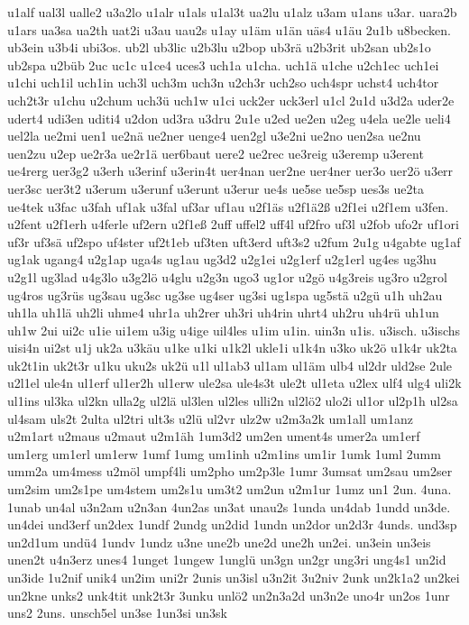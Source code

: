 {u1alf
ual3l
ualle2
u3a2lo
u1alr
u1als
u1al3t
ua2lu
u1alz
u3am
u1ans
u3ar.
uara2b
u1ars
ua3sa
ua2th
uat2i
u3au
uau2s
u1ay
u1äm
u1än
uäs4
u1äu
2u1b
u8becken.
ub3ein
u3b4i
ubi3os.
ub2l
ub3lic
u2b3lu
u2bop
ub3rä
u2b3rit
ub2san
ub2s1o
ub2spa
u2büb
2uc
uc1c
u1ce4
uces3
uch1a
u1cha.
uch1ä
u1che
u2ch1ec
uch1ei
u1chi
uch1il
uch1in
uch3l
uch3m
uch3n
u2ch3r
uch2so
uch4spr
uchst4
uch4tor
uch2t3r
u1chu
u2chum
uch3ü
uch1w
u1ci
uck2er
uck3erl
u1cl
2u1d
u3d2a
uder2e
udert4
udi3en
uditi4
u2don
ud3ra
u3dru
2u1e
u2ed
ue2en
u2eg
u4ela
ue2le
ueli4
uel2la
ue2mi
uen1
ue2nä
ue2ner
uenge4
uen2gl
u3e2ni
ue2no
uen2sa
ue2nu
uen2zu
u2ep
ue2r3a
ue2r1ä
uer6baut
uere2
ue2rec
ue3reig
u3eremp
u3erent
ue4rerg
uer3g2
u3erh
u3erinf
u3erin4t
uer4nan
uer2ne
uer4ner
uer3o
uer2ö
u3err
uer3sc
uer3t2
u3erum
u3erunf
u3erunt
u3erur
ue4s
ue5se
ue5sp
ues3s
ue2ta
ue4tek
u3fac
u3fah
uf1ak
u3fal
uf3ar
uf1au
u2f1äs
u2f1ä2ß
u2f1ei
u2f1em
u3fen.
u2fent
u2f1erh
u4ferle
uf2ern
u2f1eß
2uff
uffel2
uff4l
uf2fro
uf3l
u2fob
ufo2r
uf1ori
uf3r
uf3sä
uf2spo
uf4ster
uf2t1eb
uf3ten
uft3erd
uft3s2
u2fum
2u1g
u4gabte
ug1af
ug1ak
ugang4
u2g1ap
uga4s
ug1au
ug3d2
u2g1ei
u2g1erf
u2g1erl
ug4es
ug3hu
u2g1l
ug3lad
u4g3lo
u3g2lö
u4glu
u2g3n
ugo3
ug1or
u2gö
u4g3reis
ug3ro
u2grol
ug4ros
ug3rüs
ug3sau
ug3sc
ug3se
ug4ser
ug3si
ug1spa
ug5stä
u2gü
u1h
uh2au
uh1la
uh1lä
uh2li
uhme4
uhr1a
uh2rer
uh3ri
uh4rin
uhrt4
uh2ru
uh4rü
uh1un
uh1w
2ui
ui2c
u1ie
ui1em
u3ig
u4ige
uil4les
u1im
u1in.
uin3n
u1is.
u3isch.
u3ischs
uisi4n
ui2st
u1j
uk2a
u3käu
u1ke
u1ki
u1k2l
ukle1i
u1k4n
u3ko
uk2ö
u1k4r
uk2ta
uk2t1in
uk2t3r
u1ku
uku2s
uk2ü
u1l
ul1ab3
ul1am
ul1äm
ulb4
ul2dr
uld2se
2ule
u2l1el
ule4n
ul1erf
ul1er2h
ul1erw
ule2sa
ule4s3t
ule2t
ul1eta
u2lex
ulf4
ulg4
uli2k
ul1ins
ul3ka
ul2kn
ulla2g
ul2lä
ul3len
ul2les
ulli2n
ul2lö2
ulo2i
ul1or
ul2p1h
ul2sa
ul4sam
uls2t
2ulta
ul2tri
ult3s
u2lü
ul2vr
ulz2w
u2m3a2k
um1all
um1anz
u2m1art
u2maus
u2maut
u2m1äh
1um3d2
um2en
ument4s
umer2a
um1erf
um1erg
um1erl
um1erw
1umf
1umg
um1inh
u2m1ins
um1ir
1umk
1uml
2umm
umm2a
um4mess
u2möl
umpf4li
um2pho
um2p3le
1umr
3umsat
um2sau
um2ser
um2sim
um2s1pe
um4stem
um2s1u
um3t2
um2un
u2m1ur
1umz
un1
2un.
4una.
1unab
un4al
u3n2am
u2n3an
4un2as
un3at
unau2s
1unda
un4dab
1undd
un3de.
un4dei
und3erf
un2dex
1undf
2undg
un2did
1undn
un2dor
un2d3r
4unds.
und3sp
un2d1um
undü4
1undv
1undz
u3ne
une2b
une2d
une2h
un2ei.
un3ein
un3eis
unen2t
u4n3erz
unes4
1unget
1ungew
1unglü
un3gn
un2gr
ung3ri
ung4s1
un2id
un3ide
1u2nif
unik4
un2im
uni2r
2unis
un3isl
u3n2it
3u2niv
2unk
un2k1a2
un2kei
un2kne
unks2
unk4tit
unk2t3r
3unku
unlö2
un2n3a2d
un3n2e
uno4r
un2os
1unr
uns2
2uns.
unsch5el
un3se
1un3si
un3sk
}
